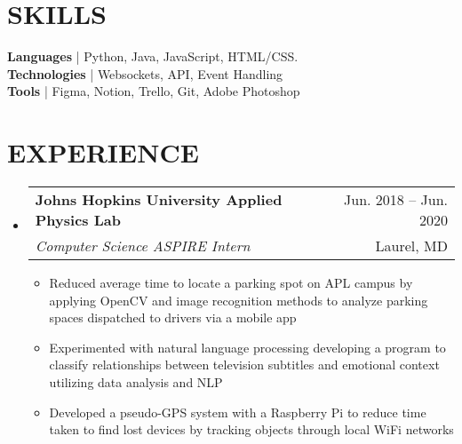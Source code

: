\documentclass[letterpaper,12pt]{extarticle}
\makeatletter
\newcommand{\resumeItem}[1]{
  \item\small{
    {#1 \vspace{-1pt}}
  }
}
\newcommand{\resumeSubheading}[4]{
  \vspace{-1pt}\item
    \begin{tabular*}{\textwidth}[t]{l@{\extracolsep{\fill}}r}
      \textbf{#1} & {\color{dark-grey}\small #2}\vspace{1pt}\\ %
      \textit{#3} & {\color{dark-grey} \small #4}\\ %
    \end{tabular*}\vspace{-4pt}
}
\newcommand{\resumeSubHeadingListStart}{\begin{itemize}[leftmargin=0in, label={}]}
\newcommand{\resumeSubHeadingListEnd}{\end{itemize}}
\newcommand{\resumeItemListStart}{\begin{itemize}}
\newcommand{\resumeItemListEnd}{\end{itemize}\vspace{0pt}}
\makeatother
\begin{document}
\vspace{-7mm}
\section{SKILLS}
 \begin{itemize}[leftmargin=0in, label={}]
    \small{\item{
     \textbf{Languages}    {| Python, Java, JavaScript, HTML/CSS.}\vspace{2pt} \\
     \textbf{Technologies} {| Websockets, API, Event Handling}\vspace{2pt} \\
     \textbf{Tools}        {| Figma, Notion, Trello, Git, Adobe Photoshop}
    }}
 \end{itemize}
 
 \vspace{-6mm}
\section{EXPERIENCE}
  \resumeSubHeadingListStart
    \resumeSubheading
    {Johns Hopkins University Applied Physics Lab}{Jun. 2018 -- Jun. 2020}
    {Computer Science ASPIRE Intern}{Laurel, MD}
    \resumeItemListStart
        \resumeItem{
            Reduced average time to locate a parking spot on APL campus by applying OpenCV and image recognition methods to analyze parking spaces dispatched to drivers via a mobile app}
        \resumeItem{
            Experimented with natural language processing developing a program to classify relationships between television subtitles and emotional context utilizing data analysis and NLP}
        \resumeItem{
            Developed a pseudo-GPS system with a Raspberry Pi to reduce time
            taken to find lost devices by tracking objects through local
            WiFi networks
        }
    \resumeItemListEnd

  \resumeSubHeadingListEnd

\vspace{-7mm}
\end{document}

